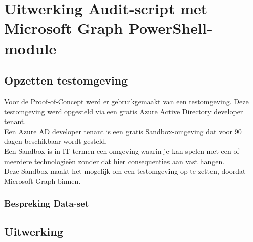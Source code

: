 
\chapter{Uitwerking Audit-script met Microsoft Graph PowerShell-module}%
\label{ch:poc}

\section{Opzetten testomgeving}

Voor de Proof-of-Concept werd er gebruikgemaakt van een testomgeving. Deze testomgeving werd opgesteld via een gratis Azure Active Directory developer tenant. \\

Een Azure \ac{AD} developer tenant is een gratis Sandbox-omgeving dat voor 90 dagen beschikbaar wordt gesteld. \\

Een Sandbox is in IT-termen een omgeving waarin je kan spelen met een of meerdere technologieën zonder dat hier consequenties aan vast hangen. \\

Deze Sandbox maakt het mogelijk om een testomgeving op te zetten, doordat Microsoft Graph binnen. \\


\subsection{Bespreking Data-set}




\section{Uitwerking}

